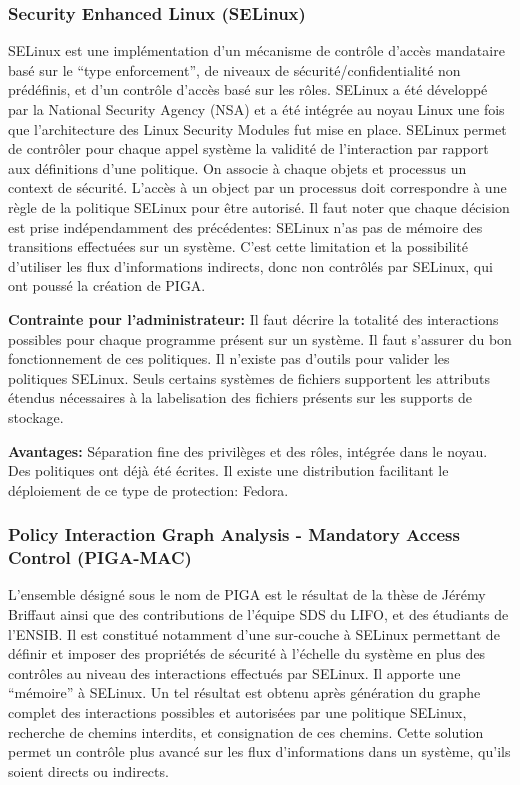 \documentclass[pdftex,a4paper,titlepage,11pt]{article}
\begin{document}
\subsubsection{Security Enhanced Linux (SELinux)}

SELinux est une implémentation d'un mécanisme de contrôle d'accès mandataire basé sur le ``type enforcement'', de niveaux de sécurité/confidentialité non prédéfinis, et d'un contrôle d'accès basé sur les rôles. SELinux a été développé par la National Security Agency (NSA) et a été intégrée au noyau Linux une fois que l'architecture des Linux Security Modules fut mise en place. SELinux permet de contrôler pour chaque appel système la validité de l'interaction par rapport aux définitions d'une politique. On associe à chaque objets et processus un context de sécurité. L'accès à un object par un processus doit correspondre à une règle de la politique SELinux pour être autorisé. Il faut noter que chaque décision est prise indépendamment des précédentes: SELinux n'as pas de mémoire des transitions effectuées sur un système. C'est cette limitation et la possibilité d'utiliser les flux d'informations indirects, donc non contrôlés par SELinux, qui ont poussé la création de PIGA.

\begin{list}{}{}
 \item \textbf{Contrainte pour l'administrateur:} Il faut décrire la totalité des interactions possibles pour chaque programme présent sur un système. Il faut s'assurer du bon fonctionnement de ces politiques. Il n'existe pas d'outils pour valider les politiques SELinux. Seuls certains systèmes de fichiers supportent les attributs étendus nécessaires à la labelisation des fichiers présents sur les supports de stockage.
 \item \textbf{Avantages:} Séparation fine des privilèges et des rôles, intégrée dans le noyau. Des politiques ont déjà été écrites. Il existe une distribution facilitant le déploiement de ce type de protection: Fedora.
\end{list}

\subsubsection{Policy Interaction Graph Analysis - Mandatory Access Control (PIGA-MAC)}

L'ensemble désigné sous le nom de PIGA est le résultat de la thèse de Jérémy Briffaut ainsi que des contributions de l'équipe SDS du LIFO, et des étudiants de l'ENSIB. Il est constitué notamment d'une sur-couche à SELinux permettant de définir et imposer des propriétés de sécurité à l'échelle du système en plus des contrôles au niveau des interactions effectués par SELinux. Il apporte une ``mémoire'' à SELinux. Un tel résultat est obtenu après génération du graphe complet des interactions possibles et autorisées par une politique SELinux, recherche de chemins interdits, et consignation de ces chemins. Cette solution permet un contrôle plus avancé sur les flux d'informations dans un système, qu'ils soient directs ou indirects.
\end{document}
